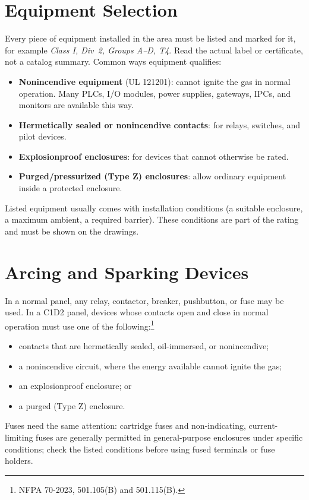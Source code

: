 \section{Equipment Selection}
Every piece of equipment installed in the area must be listed and marked for it, for example \textit{Class I, Div~2, Groups A--D, T4}. Read the actual label or certificate, not a catalog summary. Common ways equipment qualifies:
\begin{itemize}[itemsep=1pt]
  \item \textbf{Nonincendive equipment} (UL 121201): cannot ignite the gas in normal operation. Many PLCs, I/O modules, power supplies, gateways, IPCs, and monitors are available this way.
  \item \textbf{Hermetically sealed or nonincendive contacts}: for relays, switches, and pilot devices.
  \item \textbf{Explosionproof enclosures}: for devices that cannot otherwise be rated.
  \item \textbf{Purged/pressurized (Type Z) enclosures}: allow ordinary equipment inside a protected enclosure.
\end{itemize}
Listed equipment usually comes with installation conditions (a suitable enclosure, a maximum ambient, a required barrier). These conditions are part of the rating and must be shown on the drawings.

\section{Arcing and Sparking Devices}
In a normal panel, any relay, contactor, breaker, pushbutton, or fuse may be used. In a C1D2 panel, devices whose contacts open and close in normal operation must use one of the following:\footnote{NFPA 70-2023, 501.105(B) and 501.115(B).}
\begin{itemize}[itemsep=1pt]
  \item contacts that are hermetically sealed, oil-immersed, or nonincendive;
  \item a nonincendive circuit, where the energy available cannot ignite the gas;
  \item an explosionproof enclosure; or
  \item a purged (Type Z) enclosure.
\end{itemize}
Fuses need the same attention: cartridge fuses and non-indicating, current-limiting fuses are generally permitted in general-purpose enclosures under specific conditions; check the listed conditions before using fused terminals or fuse holders.

